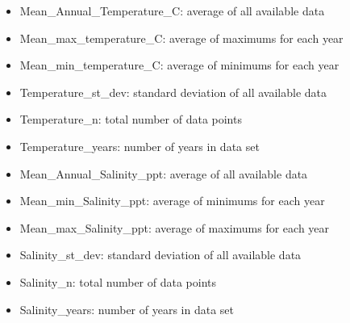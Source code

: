 \documentclass[
]{article}
\begin{document}
\begin{itemize}
\item
  Mean\_Annual\_Temperature\_C: average of all available data
\item
  Mean\_max\_temperature\_C: average of maximums for each year
\item
  Mean\_min\_temperature\_C: average of minimums for each year
\item
  Temperature\_st\_dev: standard deviation of all available data
\item
  Temperature\_n: total number of data points
\item
  Temperature\_years: number of years in data set
\item
  Mean\_Annual\_Salinity\_ppt: average of all available data
\item
  Mean\_min\_Salinity\_ppt: average of minimums for each year
\item
  Mean\_max\_Salinity\_ppt: average of maximums for each year
\item
  Salinity\_st\_dev: standard deviation of all available data
\item
  Salinity\_n: total number of data points
\item
  Salinity\_years: number of years in data set
\end{itemize}
\end{document}
